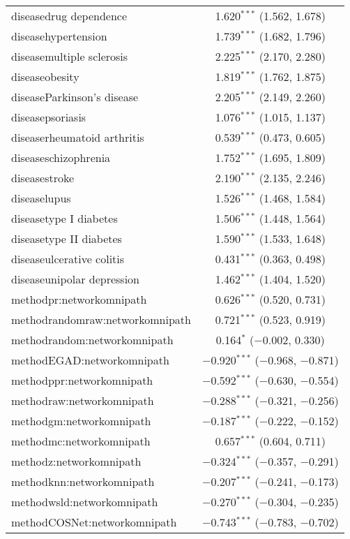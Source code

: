 \begin{table}[!htbp]
\begin{tabular}{@{\extracolsep{5pt}}lc}
  diseasedrug dependence & 1.620$^{***}$ (1.562, 1.678) \\ 
  diseasehypertension & 1.739$^{***}$ (1.682, 1.796) \\ 
  diseasemultiple sclerosis & 2.225$^{***}$ (2.170, 2.280) \\ 
  diseaseobesity & 1.819$^{***}$ (1.762, 1.875) \\ 
  diseaseParkinson's disease & 2.205$^{***}$ (2.149, 2.260) \\ 
  diseasepsoriasis & 1.076$^{***}$ (1.015, 1.137) \\ 
  diseaserheumatoid arthritis & 0.539$^{***}$ (0.473, 0.605) \\ 
  diseaseschizophrenia & 1.752$^{***}$ (1.695, 1.809) \\ 
  diseasestroke & 2.190$^{***}$ (2.135, 2.246) \\ 
  diseaselupus & 1.526$^{***}$ (1.468, 1.584) \\ 
  diseasetype I diabetes & 1.506$^{***}$ (1.448, 1.564) \\ 
  diseasetype II diabetes & 1.590$^{***}$ (1.533, 1.648) \\ 
  diseaseulcerative colitis & 0.431$^{***}$ (0.363, 0.498) \\ 
  diseaseunipolar depression & 1.462$^{***}$ (1.404, 1.520) \\ 
  methodpr:networkomnipath & 0.626$^{***}$ (0.520, 0.731) \\ 
  methodrandomraw:networkomnipath & 0.721$^{***}$ (0.523, 0.919) \\ 
  methodrandom:networkomnipath & 0.164$^{*}$ ($-$0.002, 0.330) \\ 
  methodEGAD:networkomnipath & $-$0.920$^{***}$ ($-$0.968, $-$0.871) \\ 
  methodppr:networkomnipath & $-$0.592$^{***}$ ($-$0.630, $-$0.554) \\ 
  methodraw:networkomnipath & $-$0.288$^{***}$ ($-$0.321, $-$0.256) \\ 
  methodgm:networkomnipath & $-$0.187$^{***}$ ($-$0.222, $-$0.152) \\ 
  methodmc:networkomnipath & 0.657$^{***}$ (0.604, 0.711) \\ 
  methodz:networkomnipath & $-$0.324$^{***}$ ($-$0.357, $-$0.291) \\ 
  methodknn:networkomnipath & $-$0.207$^{***}$ ($-$0.241, $-$0.173) \\ 
  methodwsld:networkomnipath & $-$0.270$^{***}$ ($-$0.304, $-$0.235) \\ 
  methodCOSNet:networkomnipath & $-$0.743$^{***}$ ($-$0.783, $-$0.702) \\ 

\end{tabular}
\end{table}
